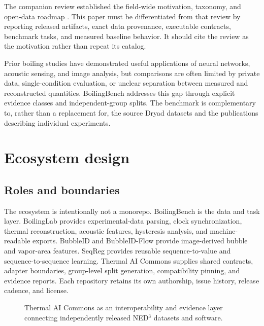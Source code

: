 \documentclass[11pt]{article}
\begin{document}
The companion review established the field-wide motivation, taxonomy, and open-data roadmap \citep{dunlap2026review}. This paper must be differentiated from that review by reporting released artifacts, exact data provenance, executable contracts, benchmark tasks, and measured baseline behavior. It should cite the review as the motivation rather than repeat its catalog.

Prior boiling studies have demonstrated useful applications of neural networks, acoustic sensing, and image analysis, but comparisons are often limited by private data, single-condition evaluation, or unclear separation between measured and reconstructed quantities. BoilingBench addresses this gap through explicit evidence classes and independent-group splits. The benchmark is complementary to, rather than a replacement for, the source Dryad datasets and the publications describing individual experiments.

\section{Ecosystem design}
\label{sec:ecosystem}

\subsection{Roles and boundaries}

The ecosystem is intentionally not a monorepo. BoilingBench is the data and task layer. BoilingLab provides experimental-data parsing, clock synchronization, thermal reconstruction, acoustic features, hysteresis analysis, and machine-readable exports. BubbleID and BubbleID-Flow provide image-derived bubble and vapor-area features. SeqReg provides reusable sequence-to-value and sequence-to-sequence learning. Thermal AI Commons supplies shared contracts, adapter boundaries, group-level split generation, compatibility pinning, and evidence reports. Each repository retains its own authorship, issue history, release cadence, and license.

\begin{figure}[t]
\centering
{}
\caption{Thermal AI Commons as an interoperability and evidence layer connecting independently released NED$^3$ datasets and software.}
\label{fig:ecosystem}
\end{figure}
\end{document}
